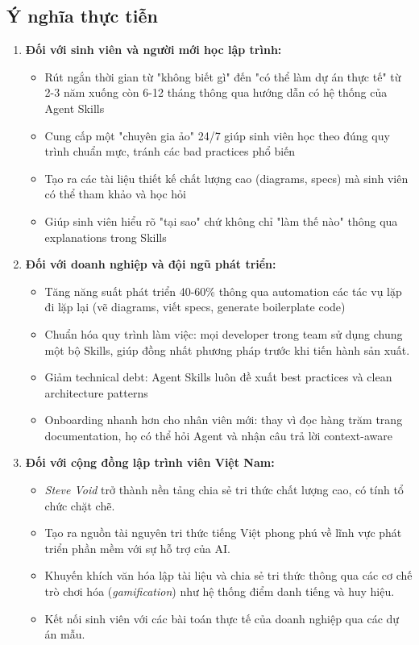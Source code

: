 \documentclass[13pt,a4paper,oneside]{extreport}
\numberwithin{equation}{chapter}
\numberwithin{figure}{chapter}
\numberwithin{table}{chapter}
\begin{document}
\subsection*{Ý nghĩa thực tiễn}

\begin{enumerate}
    \item \textbf{Đối với sinh viên và người mới học lập trình:}
    \begin{itemize}
        \item Rút ngắn thời gian từ "không biết gì" đến "có thể làm dự án thực tế" từ 2-3 năm xuống còn 6-12 tháng thông qua hướng dẫn có hệ thống của Agent Skills
        \item Cung cấp một "chuyên gia ảo" 24/7 giúp sinh viên học theo đúng quy trình chuẩn mực, tránh các bad practices phổ biến
        \item Tạo ra các tài liệu thiết kế chất lượng cao (diagrams, specs) mà sinh viên có thể tham khảo và học hỏi
        \item Giúp sinh viên hiểu rõ "tại sao" chứ không chỉ "làm thế nào" thông qua explanations trong Skills
    \end{itemize}

    \item \textbf{Đối với doanh nghiệp và đội ngũ phát triển:}
    \begin{itemize}
        \item Tăng năng suất phát triển 40-60\% thông qua automation các tác vụ lặp đi lặp lại (vẽ diagrams, viết specs, generate boilerplate code)
        \item Chuẩn hóa quy trình làm việc: mọi developer trong team sử dụng chung một bộ Skills, giúp đồng nhất phương pháp trước khi tiến hành sản xuất.
        \item Giảm technical debt: Agent Skills luôn đề xuất best practices và clean architecture patterns
        \item Onboarding nhanh hơn cho nhân viên mới: thay vì đọc hàng trăm trang documentation, họ có thể hỏi Agent và nhận câu trả lời context-aware
    \end{itemize}

    \item \textbf{Đối với cộng đồng lập trình viên Việt Nam:}
    \begin{itemize}
        \item \textit{Steve Void} trở thành nền tảng chia sẻ tri thức chất lượng cao, có tính tổ chức chặt chẽ.
        \item Tạo ra nguồn tài nguyên tri thức tiếng Việt phong phú về lĩnh vực phát triển phần mềm với sự hỗ trợ của AI.
        \item Khuyến khích văn hóa lập tài liệu và chia sẻ tri thức thông qua các cơ chế trò chơi hóa (\textit{gamification}) như hệ thống điểm danh tiếng và huy hiệu.
        \item Kết nối sinh viên với các bài toán thực tế của doanh nghiệp qua các dự án mẫu.
    \end{itemize}


\end{enumerate}
\end{document}
